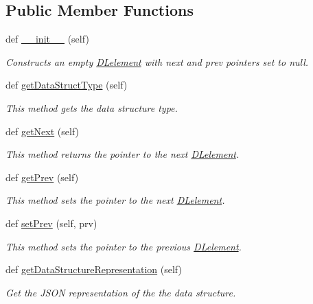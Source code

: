 \subsection*{Public Member Functions}
\begin{DoxyCompactItemize}
\item 
def \hyperlink{class_d_lelement_1_1_d_lelement_a9d3d954a7f1ada34972349737bf2f58f}{\+\_\+\+\_\+init\+\_\+\+\_\+} (self)
\begin{DoxyCompactList}\small\item\em Constructs an empty \hyperlink{class_d_lelement_1_1_d_lelement}{D\+Lelement} with next and prev pointers set to null. \end{DoxyCompactList}\item 
def \hyperlink{class_d_lelement_1_1_d_lelement_ae386146e887532ec47ca14a7a10a3dfd}{get\+Data\+Struct\+Type} (self)
\begin{DoxyCompactList}\small\item\em This method gets the data structure type. \end{DoxyCompactList}\item 
def \hyperlink{class_d_lelement_1_1_d_lelement_a16aad8d30ec3393be017f3bb77349e26}{get\+Next} (self)
\begin{DoxyCompactList}\small\item\em This method returns the pointer to the next \hyperlink{class_d_lelement_1_1_d_lelement}{D\+Lelement}. \end{DoxyCompactList}\item 
def \hyperlink{class_d_lelement_1_1_d_lelement_a05ecf23273037e12fcaab38013e2760e}{get\+Prev} (self)
\begin{DoxyCompactList}\small\item\em This method sets the pointer to the next \hyperlink{class_d_lelement_1_1_d_lelement}{D\+Lelement}. \end{DoxyCompactList}\item 
def \hyperlink{class_d_lelement_1_1_d_lelement_a49e8225b9c3afa5f306480d50b4166f9}{set\+Prev} (self, prv)
\begin{DoxyCompactList}\small\item\em This method sets the pointer to the previous \hyperlink{class_d_lelement_1_1_d_lelement}{D\+Lelement}. \end{DoxyCompactList}\item 
def \hyperlink{class_d_lelement_1_1_d_lelement_aa8fbfd5aacb78c24bd181dc716dadd0a}{get\+Data\+Structure\+Representation} (self)
\begin{DoxyCompactList}\small\item\em Get the J\+S\+ON representation of the the data structure. \end{DoxyCompactList}\end{DoxyCompactItemize}
